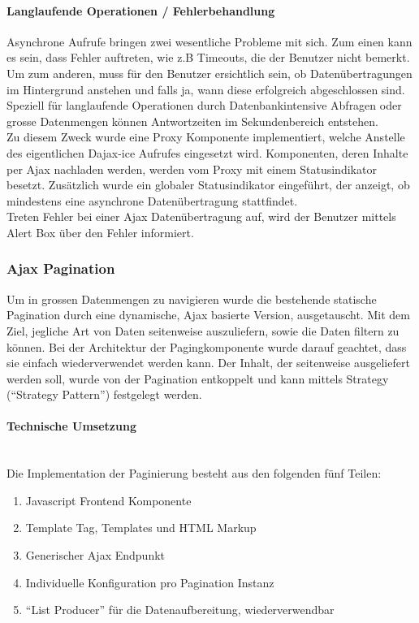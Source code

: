 \paragraph{Langlaufende Operationen / Fehlerbehandlung}
Asynchrone Aufrufe bringen zwei wesentliche Probleme mit sich. Zum einen kann es sein, dass Fehler auftreten, wie z.B Timeouts, die der Benutzer nicht bemerkt. Um zum anderen, muss für den Benutzer ersichtlich sein, ob Datenübertragungen im Hintergrund anstehen und falls ja, wann diese erfolgreich abgeschlossen sind. Speziell für langlaufende Operationen durch Datenbankintensive Abfragen oder grosse Datenmengen können Antwortzeiten im Sekundenbereich entstehen. \\
Zu diesem Zweck wurde eine Proxy Komponente \cite{gamma1994design} implementiert, welche Anstelle des eigentlichen Dajax-ice Aufrufes eingesetzt wird. Komponenten, deren Inhalte per Ajax nachladen werden, werden vom Proxy mit einem Statusindikator besetzt. Zusätzlich wurde ein globaler Statusindikator eingeführt, der anzeigt, ob mindestens eine asynchrone Datenübertragung stattfindet.\\
Treten Fehler bei einer Ajax Datenübertragung auf, wird der Benutzer mittels Alert Box über den Fehler informiert.

\subsubsection{Ajax Pagination} Um in grossen Datenmengen zu navigieren wurde
die bestehende statische Pagination durch eine dynamische, Ajax basierte
Version, ausgetauscht. Mit dem Ziel, jegliche Art von Daten seitenweise auszuliefern, sowie die Daten filtern zu können. 
Bei der Architektur der Pagingkomponente wurde darauf geachtet, dass sie einfach wiederverwendet werden kann. Der Inhalt, der seitenweise ausgeliefert werden soll, wurde von der Pagination entkoppelt und kann mittels Strategy (\enquote{Strategy Pattern}\cite{gamma1994design}) festgelegt werden.

\paragraph{Technische Umsetzung} \hspace{0pt} \\
Die Implementation der Paginierung besteht aus den folgenden fünf Teilen:
\begin{enumerate}
	\item Javascript Frontend Komponente
	\item Template Tag, Templates und HTML Markup
	\item Generischer Ajax Endpunkt
	\item Individuelle Konfiguration pro Pagination Instanz
	\item \enquote{List Producer} für die Datenaufbereitung, wiederverwendbar
\end{enumerate}

